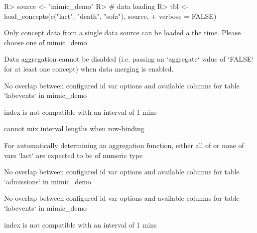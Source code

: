 \documentclass[
]{jss}
\begin{document}
\begin{CodeChunk}

\begin{CodeInput}
R> source <- "mimic_demo"
R> # data loading
R> tbl <- load_concepts(c("lact", "death", "sofa"), source,
+                      verbose = FALSE)
\end{CodeInput}

\begin{CodeOutput}
Only concept data from a single data source can be loaded a the time. Please
choose one of mimic_demo
\end{CodeOutput}

\begin{CodeOutput}
Data aggregation cannot be disabled (i.e. passing an `aggregate` value of
`FALSE` for at least one concept) when data merging is enabled.
\end{CodeOutput}

\begin{CodeOutput}
No overlap between configured id var options and available columns for table
`labevents` in mimic_demo
\end{CodeOutput}

\begin{CodeOutput}
index is not compatible with an interval of 1 mins
\end{CodeOutput}

\begin{CodeOutput}
cannot mix interval lengths when row-binding
\end{CodeOutput}

\begin{CodeOutput}
For automatically determining an aggregation function, either all of or none of
vars `lact` are expected to be of numeric type
\end{CodeOutput}

\begin{CodeOutput}
No overlap between configured id var options and available columns for table
`admissions` in mimic_demo
\end{CodeOutput}

\begin{CodeOutput}
No overlap between configured id var options and available columns for table
`labevents` in mimic_demo
\end{CodeOutput}

\begin{CodeOutput}
index is not compatible with an interval of 1 mins
\end{CodeOutput}


\end{CodeChunk}
\end{document}
